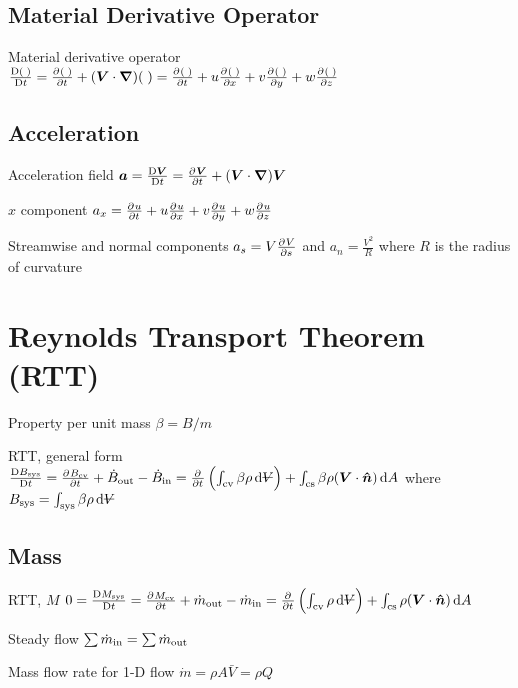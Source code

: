 \documentclass{article}
\begin{document}
\subsection{Material Derivative Operator}
\begin{description*}
\item[Material derivative operator]
  \(\frac{\Dif{(\;)}}{\Dif t} = \pd{(\;)}{t} + (\vec V \cdot \del)(\;)
  = \pd{(\;)}{t} + u\pd{(\;)}{x} + v\pd{(\;)}{y} + w\pd{(\;)}{z}\)
\end{description*}

\subsection{Acceleration}
\begin{description*}
\item[Acceleration field]
  \(\vec a = \frac{\Dif\vec{V}}{\Dif t} = \pd{\vec V}{t} + (\vec{V}\cdot\del)\vec{V}\)
\item[$x$ component]
  \(a_x = \pd{u}{t} + u\pd{u}{x} + v\pd{u}{y} + w\pd{u}{z}\)
\item[Streamwise and normal components]
  \(a_s = V\pd{V}{s}\) and \(a_n = \frac{V^2}{R}\)
  where $R$ is the radius of curvature
\end{description*}

\section{Reynolds Transport Theorem (RTT)}
\begin{description*}
\item[Property per unit mass]
  \(\beta = B/m\)
\item[RTT, general form]
  \(\frac{\Dif B_\mrm{sys}}{\Dif t}
  = \pd{B_\mrm{cv}}{t}+\dot{B}_\mrm{out} - \dot{B}_\mrm{in}
  = \pd{}{t}\left(\int_\mrm{cv}\beta\rho\dif{\volsym}\right)
  + \int_\mrm{cs}\beta\rho(\vec{V}\cdot\uvec{n})\dif{A}\)
  where
  \(B_\mrm{sys} = \int_\mrm{sys}\beta\rho\dif{\volsym}\)
\end{description*}

\subsection{Mass}
\begin{description*}
\item[RTT, $M$]
  \(0 = \frac{\Dif M_\mrm{sys}}{\Dif t}
  = \pd{M_\mrm{cv}}{t}+\dot{m}_\mrm{out}-\dot{m}_\mrm{in}
  = \pd{}{t}\left(\int_\mrm{cv}\rho\dif{\volsym}\right)
  + \int_\mrm{cs}\rho(\vec{V}\cdot\uvec{n})\dif{A}\)
\item[Steady flow]
  \(\sum\dot{m}_{\mathrm{in}} = \sum\dot{m}_{\mathrm{out}}\)
\item[Mass flow rate for 1-D flow]
  \(\dot{m} = \rho A \bar{V} = \rho Q\)
\end{description*}
\end{document}
